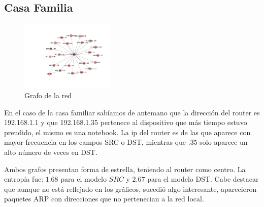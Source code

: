 \subsection{Casa Familia}

\begin{figure}
\vspace{-35pt}
\hspace{-35pt}
\centering
   \includegraphics[width=0.4\textwidth]{resultados/casa/conectividadNX.pdf}
\vspace{-30pt}
   \caption{Grafo de la red}
\end{figure}

En el caso de la casa familiar sab\'iamos de antemano que la direcci\'on del router
es 192.168.1.1 y que 192.168.1.35 pertenece al dispositivo que m\'as tiempo estuvo
prendido, el mismo es una notebook. La ip del router es de las que aparece con mayor
frecuencia en los campos SRC o DST, mientras que $.35$ solo aparece un alto n\'umero
de veces en DST. 

Ambos grafos presentan forma de estrella, teniendo al router como centro. 
La entrop\'ia fue: $1.68$ para el modelo $SRC$ y $2.67$ para el modelo DST.
Cabe destacar que aunque no est\'a reflejado en los gr\'aficos, sucedi\'o algo interesante, 
aparecieron paquetes ARP con direcciones que no pertenecian a la red local.

